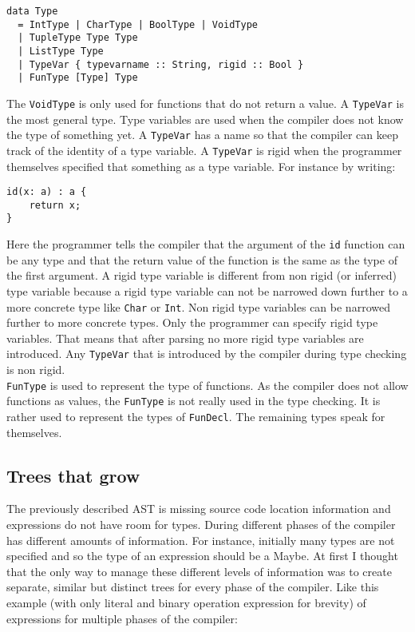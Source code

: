 \documentclass{report}
\begin{document}
\begin{verbatim}
data Type
  = IntType | CharType | BoolType | VoidType
  | TupleType Type Type
  | ListType Type
  | TypeVar { typevarname :: String, rigid :: Bool }
  | FunType [Type] Type 
\end{verbatim}
The \texttt{VoidType} is only used for functions that do not return a value. 
A \texttt{TypeVar} is the most general type. Type variables are used when the compiler does not know the type of something yet. A \texttt{TypeVar} has a name so that the compiler can keep track of the identity of a type variable. A \texttt{TypeVar} is rigid when the programmer themselves specified that something as a type variable. For instance by writing: \begin{lstlisting}[style=SPL]
id(x: a) : a { 
    return x;
}
\end{lstlisting} 
Here the programmer tells the compiler that the argument of the \texttt{id} function can be any type and that the return value of the function is the same as the type of the first argument. A rigid type variable is different from non rigid (or inferred) type variable because a rigid type variable can not be narrowed down further to a more concrete type like \texttt{Char} or \texttt{Int}. Non rigid type variables can be narrowed further to more concrete types. Only the programmer can specify rigid type variables. That means that after parsing no more rigid type variables are introduced. Any \texttt{TypeVar} that is introduced by the compiler during type checking is non rigid. 
\\
\texttt{FunType} is used to represent the type of functions. As the compiler does not allow functions as values, the \texttt{FunType} is not really used in the type checking. It is rather used to represent the types of \texttt{FunDecl}. The remaining types speak for themselves.

\subsection{Trees that grow}

The previously described AST is missing source code location information and expressions do not have room for types. During different phases of the compiler has different amounts of information. For instance, initially many types are not specified and so the type of an expression should be a Maybe. At first I thought that the only way to manage these different levels of information was to create separate, similar but distinct trees for every phase of the compiler. Like this example (with only literal and binary operation expression for brevity) of expressions for multiple phases of the compiler:
\end{document}
